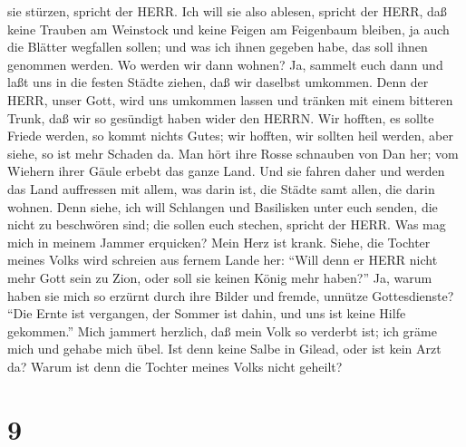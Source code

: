 sie stürzen, spricht der HERR.  Ich will sie also ablesen,
spricht der HERR, daß keine Trauben am Weinstock und keine Feigen am
Feigenbaum bleiben, ja auch die Blätter wegfallen sollen; und was ich
ihnen gegeben habe, das soll ihnen genommen werden.  Wo
werden wir dann wohnen? Ja, sammelt euch dann und laßt uns in die festen
Städte ziehen, daß wir daselbst umkommen. Denn der HERR, unser Gott,
wird uns umkommen lassen und tränken mit einem bitteren Trunk, daß wir
so gesündigt haben wider den HERRN.  Wir hofften, es sollte
Friede werden, so kommt nichts Gutes; wir hofften, wir sollten heil
werden, aber siehe, so ist mehr Schaden da.  Man hört ihre
Rosse schnauben von Dan her; vom Wiehern ihrer Gäule erbebt das ganze
Land. Und sie fahren daher und werden das Land auffressen mit allem, was
darin ist, die Städte samt allen, die darin wohnen.  Denn
siehe, ich will Schlangen und Basilisken unter euch senden, die nicht zu
beschwören sind; die sollen euch stechen, spricht der HERR.
 Was mag mich in meinem Jammer erquicken? Mein Herz ist
krank.  Siehe, die Tochter meines Volks wird schreien aus
fernem Lande her: ``Will denn er HERR nicht mehr Gott sein zu Zion, oder
soll sie keinen König mehr haben?'' Ja, warum haben sie mich so erzürnt
durch ihre Bilder und fremde, unnütze Gottesdienste?  ``Die
Ernte ist vergangen, der Sommer ist dahin, und uns ist keine Hilfe
gekommen.''  Mich jammert herzlich, daß mein Volk so
verderbt ist; ich gräme mich und gehabe mich übel.  Ist
denn keine Salbe in Gilead, oder ist kein Arzt da? Warum ist denn die
Tochter meines Volks nicht geheilt?

\hypertarget{section-8}{%
\section{9}\label{section-8}}

